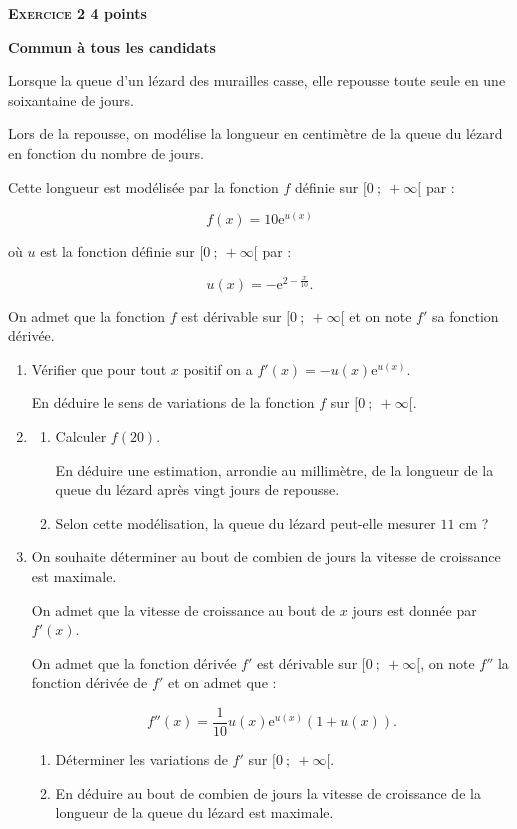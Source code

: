\documentclass[10pt,a4paper]{article}
\begin{document}
\newpage

\textbf{\textsc{Exercice 2} \hfill 4 points}

\textbf{Commun à tous les candidats}

\medskip

Lorsque la queue d'un lézard des murailles casse, elle repousse toute seule en une soixantaine de jours.

Lors de la repousse, on modélise la longueur en centimètre de la queue du lézard en fonction du nombre de jours.

Cette longueur est modélisée par la fonction $f$ définie sur 
$[0~;~+ \infty[$ par :

\[f(x) = 10\text{e}^{u(x)}\]

où $u$ est la fonction définie sur $[0~;~+ \infty[$ par :
 
\[u(x) = - \text{e}^{2 - \frac{x}{10}}.\]

On admet que la fonction $f$ est dérivable sur $[0~;~+ \infty[$ et on note $f'$ sa fonction dérivée.

\medskip

\begin{enumerate}
\item Vérifier que pour tout $x$ positif on a $f'(x) = - u(x)\text{e}^{u(x)}$.

En déduire le sens de variations de la fonction $f$ sur $[0~;~+ \infty[$.
\item  
	\begin{enumerate}
		\item Calculer $f(20)$.
		
En déduire une estimation, arrondie au millimètre, de la longueur de la queue du lézard après vingt jours de repousse.
		\item Selon cette modélisation, la queue du lézard peut-elle mesurer $11$ cm ?
	\end{enumerate}
\item  On souhaite déterminer au bout de combien de jours la vitesse de croissance est maximale.

On admet que la vitesse de croissance au bout de $x$ jours est donnée par $f'(x)$.

On admet que la fonction dérivée $f'$ est dérivable sur $[0~;~+ \infty[$, on note $f''$ la fonction dérivée de $f'$ et on admet que :

\[f''(x) = \dfrac{1}{10}u(x)\text{e}^{u(x)}(1 + u(x)).\]

	\begin{enumerate}
		\item Déterminer les variations de $f'$ sur  $[0~;~+ \infty[$.
		\item En déduire au bout de combien de jours la vitesse de croissance de la longueur de la queue du lézard est maximale.
	\end{enumerate}
\end{enumerate}
\end{document}
